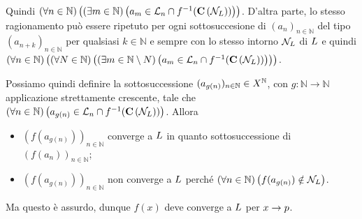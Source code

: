 \par Quindi $\left ( \forall n \in \mathbb{N} \right ) \left ( \left ( \exists m \in \mathbb{N} \right ) \left ( a_m \in \mathcal{L}_n \cap f^{-1}(\mathbf{C} \left ( \mathcal{N}_L \right )) \right ) \right )$. D'altra parte, lo stesso ragionamento pu\`o essere ripetuto per ogni sottosuccesione di $(a_n)_{n \in \mathbb{N}}$ del tipo $(a_{n + k})_{n \in \mathbb{N}}$ per qualsiasi $k \in \mathbb{N}$ e sempre con lo stesso intorno $\mathcal{N}_L$ di $L$ e quindi $\left ( \forall n \in \mathbb{N} \right ) \left ( \left ( \forall N \in \mathbb{N} \right ) \left ( \left ( \exists m \in \mathbb{N} \setminus N \right ) \left ( a_m \in \mathcal{L}_n \cap f^{-1}(\mathbf{C} \left ( \mathcal{N}_L \right )) \right ) \right ) \right )$.
\par Possiamo quindi definire la sottosuccessione $(a_{g(n)})_{n \in \mathbb{N}} \in X^{\mathbb{N}}$, con $g: \mathbb{N} \rightarrow \mathbb{N}$ applicazione strettamente crescente, tale che $\left ( \forall n \in \mathbb{N} \right ) \left ( a_{g(n)} \in \mathcal{L}_n \cap f^{-1}(\mathbf{C} \left ( \mathcal{N}_L \right )) \right )$. Allora
\begin{itemize}
	\item $(f(a_{g(n)}))_{n \in \mathbb{N}}$ converge a $L$ in quanto sottosuccessione di $(f(a_n))_{n \in \mathbb{N}}$;
	\item $(f(a_{g(n)}))_{n \in \mathbb{N}}$ non converge a $L$ perch\'e $\left ( \forall n \in \mathbb{N} \right ) \left ( f(a_{g(n)}) \notin \mathcal{N}_L \right )$.
\end{itemize}
Ma questo \`e assurdo, dunque $f(x)$ deve converge a $L$ per $x \rightarrow p$. \EndProof
